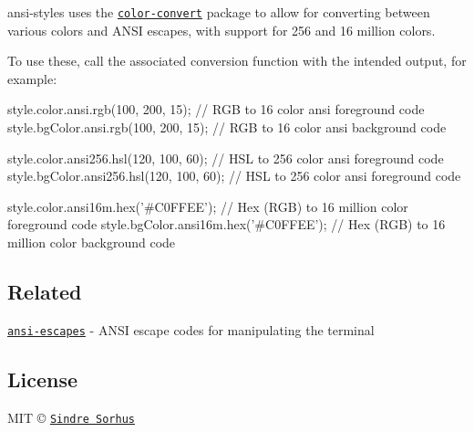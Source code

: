 {\ttfamily ansi-\/styles} uses the \href{https://github.com/Qix-/color-convert}{\tt {\ttfamily color-\/convert}} package to allow for converting between various colors and A\+N\+SI escapes, with support for 256 and 16 million colors.

To use these, call the associated conversion function with the intended output, for example\+:


\begin{DoxyCode}
style.color.ansi.rgb(100, 200, 15); // RGB to 16 color ansi foreground code
style.bgColor.ansi.rgb(100, 200, 15); // RGB to 16 color ansi background code

style.color.ansi256.hsl(120, 100, 60); // HSL to 256 color ansi foreground code
style.bgColor.ansi256.hsl(120, 100, 60); // HSL to 256 color ansi foreground code

style.color.ansi16m.hex('#C0FFEE'); // Hex (RGB) to 16 million color foreground code
style.bgColor.ansi16m.hex('#C0FFEE'); // Hex (RGB) to 16 million color background code
\end{DoxyCode}


\subsection*{Related}


\begin{DoxyItemize}
\item \href{https://github.com/sindresorhus/ansi-escapes}{\tt ansi-\/escapes} -\/ A\+N\+SI escape codes for manipulating the terminal
\end{DoxyItemize}

\subsection*{License}

M\+IT © \href{https://sindresorhus.com}{\tt Sindre Sorhus} 